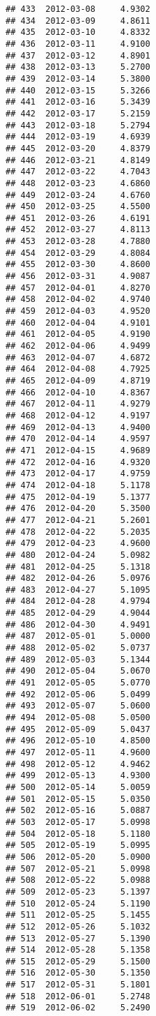 \documentclass[
]{article}
\begin{document}
\begin{verbatim}
## 433  2012-03-08     4.9302
## 434  2012-03-09     4.8611
## 435  2012-03-10     4.8332
## 436  2012-03-11     4.9100
## 437  2012-03-12     4.8901
## 438  2012-03-13     5.2700
## 439  2012-03-14     5.3800
## 440  2012-03-15     5.3266
## 441  2012-03-16     5.3439
## 442  2012-03-17     5.2159
## 443  2012-03-18     5.2794
## 444  2012-03-19     4.6939
## 445  2012-03-20     4.8379
## 446  2012-03-21     4.8149
## 447  2012-03-22     4.7043
## 448  2012-03-23     4.6860
## 449  2012-03-24     4.6760
## 450  2012-03-25     4.5500
## 451  2012-03-26     4.6191
## 452  2012-03-27     4.8113
## 453  2012-03-28     4.7880
## 454  2012-03-29     4.8084
## 455  2012-03-30     4.8600
## 456  2012-03-31     4.9087
## 457  2012-04-01     4.8270
## 458  2012-04-02     4.9740
## 459  2012-04-03     4.9520
## 460  2012-04-04     4.9101
## 461  2012-04-05     4.9190
## 462  2012-04-06     4.9499
## 463  2012-04-07     4.6872
## 464  2012-04-08     4.7925
## 465  2012-04-09     4.8719
## 466  2012-04-10     4.8367
## 467  2012-04-11     4.9279
## 468  2012-04-12     4.9197
## 469  2012-04-13     4.9400
## 470  2012-04-14     4.9597
## 471  2012-04-15     4.9689
## 472  2012-04-16     4.9320
## 473  2012-04-17     4.9759
## 474  2012-04-18     5.1178
## 475  2012-04-19     5.1377
## 476  2012-04-20     5.3500
## 477  2012-04-21     5.2601
## 478  2012-04-22     5.2035
## 479  2012-04-23     4.9600
## 480  2012-04-24     5.0982
## 481  2012-04-25     5.1318
## 482  2012-04-26     5.0976
## 483  2012-04-27     5.1095
## 484  2012-04-28     4.9794
## 485  2012-04-29     4.9044
## 486  2012-04-30     4.9491
## 487  2012-05-01     5.0000
## 488  2012-05-02     5.0737
## 489  2012-05-03     5.1344
## 490  2012-05-04     5.0670
## 491  2012-05-05     5.0770
## 492  2012-05-06     5.0499
## 493  2012-05-07     5.0600
## 494  2012-05-08     5.0500
## 495  2012-05-09     5.0437
## 496  2012-05-10     4.8500
## 497  2012-05-11     4.9600
## 498  2012-05-12     4.9462
## 499  2012-05-13     4.9300
## 500  2012-05-14     5.0059
## 501  2012-05-15     5.0350
## 502  2012-05-16     5.0887
## 503  2012-05-17     5.0998
## 504  2012-05-18     5.1180
## 505  2012-05-19     5.0995
## 506  2012-05-20     5.0900
## 507  2012-05-21     5.0998
## 508  2012-05-22     5.0988
## 509  2012-05-23     5.1397
## 510  2012-05-24     5.1190
## 511  2012-05-25     5.1455
## 512  2012-05-26     5.1032
## 513  2012-05-27     5.1390
## 514  2012-05-28     5.1358
## 515  2012-05-29     5.1500
## 516  2012-05-30     5.1350
## 517  2012-05-31     5.1801
## 518  2012-06-01     5.2748
## 519  2012-06-02     5.2490

\end{verbatim}
\end{document}
